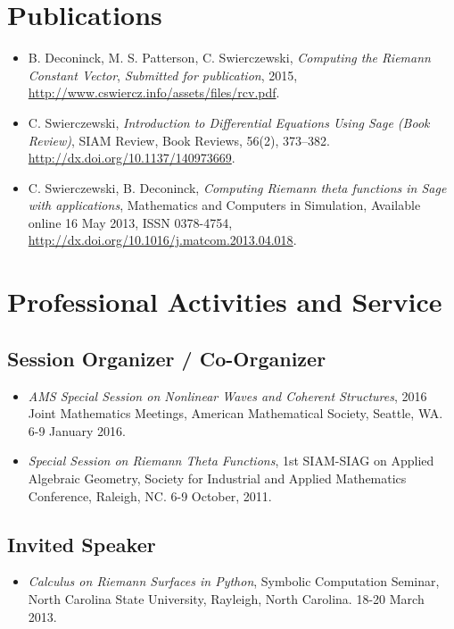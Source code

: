 \documentclass{article}
\begin{document}
\section*{Publications}

\begin{itemize}
\item B. Deconinck, M. S. Patterson, C. Swierczewski, {\it Computing the
  Riemann Constant Vector}, {\it Submitted for publication}, 2015,
  \url{http://www.cswiercz.info/assets/files/rcv.pdf}.
\item C. Swierczewski, {\it Introduction to Differential Equations Using
  Sage (Book Review)}, SIAM Review, Book Reviews, 56(2), 373--382.
  \url{http://dx.doi.org/10.1137/140973669}.
\item C. Swierczewski, B. Deconinck, {\it Computing Riemann theta
  functions in Sage with applications}, Mathematics and Computers in
  Simulation, Available online 16 May 2013, ISSN 0378-4754,
  \\ \url{http://dx.doi.org/10.1016/j.matcom.2013.04.018}.
\end{itemize}

\section*{Professional Activities and Service}

\subsection*{Session Organizer / Co-Organizer}
\begin{itemize}
  \item {\it AMS Special Session on Nonlinear Waves and Coherent Structures},
    2016 Joint Mathematics Meetings, American Mathematical Society, Seattle,
    WA. 6-9 January 2016.
  \item {\it Special Session on Riemann Theta Functions}, 1st SIAM-SIAG on
    Applied Algebraic Geometry, Society for Industrial and Applied Mathematics
    Conference, Raleigh, NC. 6-9 October, 2011.
\end{itemize}

\subsection*{Invited Speaker}
\begin{itemize}
  \item {\it Calculus on Riemann Surfaces in Python}, Symbolic
    Computation Seminar, North Carolina State University, Rayleigh,
    North Carolina. 18-20 March 2013.
\end{itemize}
\end{document}
